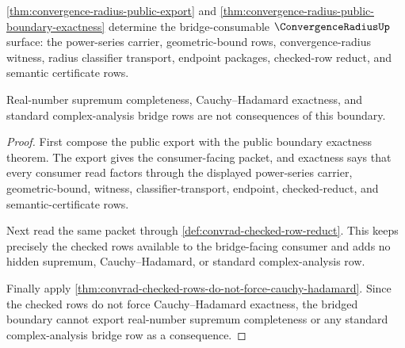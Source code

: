 \begin{theorem}
\label{thm:convergence-radius-bridged-boundary}
\autoref{thm:convergence-radius-public-export} and
\autoref{thm:convergence-radius-public-boundary-exactness} determine the
bridge-consumable $\ConvergenceRadiusUp$ surface: the power-series carrier,
geometric-bound rows, convergence-radius witness, radius classifier transport,
endpoint packages, checked-row reduct, and semantic certificate rows.

Real-number supremum completeness, Cauchy--Hadamard exactness, and standard
complex-analysis bridge rows are not consequences of this boundary.
\end{theorem}
\begin{proof}
First compose the public export with the public boundary exactness theorem.
The export gives the consumer-facing packet, and exactness says that every
consumer read factors through the displayed power-series carrier,
geometric-bound, witness, classifier-transport, endpoint, checked-reduct, and
semantic-certificate rows.

Next read the same packet through
\autoref{def:convrad-checked-row-reduct}. This keeps precisely the checked
rows available to the bridge-facing consumer and adds no hidden supremum,
Cauchy--Hadamard, or standard complex-analysis row.

Finally apply
\autoref{thm:convrad-checked-rows-do-not-force-cauchy-hadamard}. Since the
checked rows do not force Cauchy--Hadamard exactness, the bridged boundary
cannot export real-number supremum completeness or any standard
complex-analysis bridge row as a consequence.
\end{proof}

